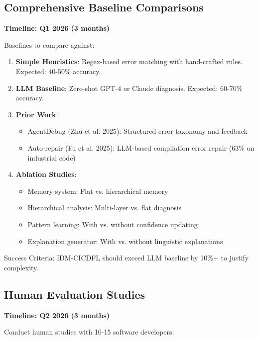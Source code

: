 \documentclass[11pt]{article}
\begin{document}
\subsection{Comprehensive Baseline Comparisons}

\textbf{Timeline: Q1 2026 (3 months)}

Baselines to compare against:

\begin{enumerate}
    \item \textbf{Simple Heuristics}: Regex-based error matching with hand-crafted rules. Expected: 40-50\% accuracy.

    \item \textbf{LLM Baseline}: Zero-shot GPT-4 or Claude diagnosis. Expected: 60-70\% accuracy.

    \item \textbf{Prior Work}:
    \begin{itemize}
        \item AgentDebug (Zhu et al. 2025): Structured error taxonomy and feedback
        \item Auto-repair (Fu et al. 2025): LLM-based compilation error repair (63\% on industrial code)
    \end{itemize}

    \item \textbf{Ablation Studies}:
    \begin{itemize}
        \item Memory system: Flat vs. hierarchical memory
        \item Hierarchical analysis: Multi-layer vs. flat diagnosis
        \item Pattern learning: With vs. without confidence updating
        \item Explanation generator: With vs. without linguistic explanations
    \end{itemize}
\end{enumerate}

Success Criteria: IDM-CICDFL should exceed LLM baseline by 10\%+ to justify complexity.

\subsection{Human Evaluation Studies}

\textbf{Timeline: Q2 2026 (3 months)}

Conduct human studies with 10-15 software developers:
\end{document}
